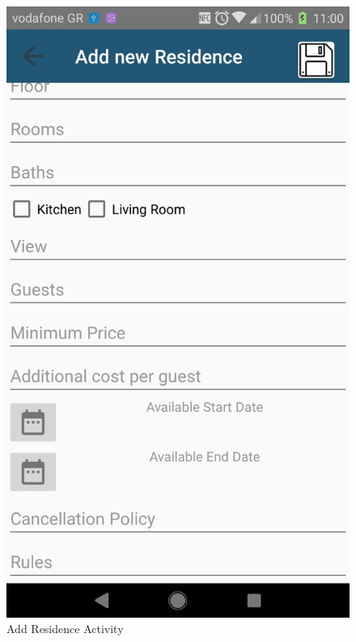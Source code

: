 \documentclass[12pt]{article}
\begin{document}
\begin{figure} [H]
\begin{center}
			\includegraphics [scale = 0.18] {26-addResidence.jpg}
			\caption{Add Residence Activity}
		\end{center}
	\end{figure}
	
\end{document}
